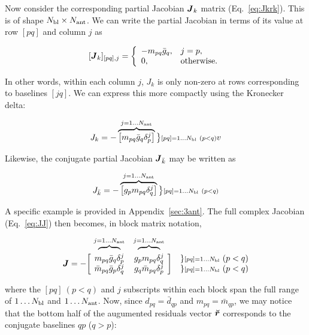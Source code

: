 \documentclass[useAMS,usenatbib]{mn2e}
\newcommand{\mat}[1]{{\bmath{#1}}}
\newcommand{\JJ}{\mat{J}} %
\begin{document}
Now consider the corresponding partial Jacobian $\JJ_k$ matrix (Eq.~\ref{eq:Jkrk}). This is of shape $N_\mathrm{bl}\times N_\mathrm{ant}$. We can write the
partial Jacobian in terms of its value at row $[pq]$ and column $j$ as 

\[
[ \JJ_k ]_{[pq],j} = \left \{  
  \begin{array}{ll} 
  -m_{pq}\bar{g}_q,& j=p, \\
  0, & \mathrm{otherwise.}
  \end{array}
\right .
\]

In other words, within each column $j$, $J_k$ is only non-zero at rows corresponding to baselines $[jq]$. We can express 
this more compactly using the Kronecker delta:


\begin{equation}
\label{eq:Jk}
J_k = - \overbrace{ \Matrix{c}{ m_{pq}\bar{g}_q\delta^{j}_p } } ^{j=1\dots \Na} \big \}{\scriptstyle [pq]=1\dots \Nbl~(p<q)}
v\end{equation}

Likewise, the conjugate partial Jacobian $\JJ_{\bar{k}}$ may be written as

\begin{equation}
\label{eq:Jbark}
J_{\bar{k}} = - \overbrace{ \Matrix{c}{ g_p m_{pq} \delta^{j}_q } } ^{j=1\dots \Na} \big \}{\scriptstyle [pq]=1\dots \Nbl~(p<q)}
\end{equation}

A specific example is provided in Appendix~\ref{sec:3ant}. The full complex Jacobian (Eq.~\ref{eq:JJ}) then 
becomes, in block matrix notation,

\begin{equation}
\label{eq:JJ:di:basic}
\begin{array}{r@{~}cc@{~}cc}
                & \overbrace{~~~~~~~~}^{j=1\dots \Na} & \overbrace{~~~~~~~~}^{j=1\dots \Na} \\
\JJ = - \bigg [ &
  \Stack{ m_{pq}\bar{g}_q\delta^{j}_p \\ \bar{m}_{pq} \bar{g}_p \delta^{j}_q } &
  \Stack{ g_p m_{pq} \delta^{j}_q \\ g_q \bar{m}_{pq} \delta^{j}_p }  
& \bigg ] &
\Stack{ \} {\scriptstyle [pq]=1\dots \Nbl}~(p<q) \\ \} {\scriptstyle [pq]=1\dots \Nbl}~(p<q) }

\end{array}
\end{equation}

where the $[pq]~(p<q)$ and $j$ subscripts within each block span the full range of $1\dots N_\mathrm{bl}$ and $1\dots N_\mathrm{ant}$. Now, 
since $d_{pq} = \bar{d}_{qp}$ and $m_{pq} = \bar{m}_{qp}$, we may notice
that the bottom half of the augumented residuals vector $\Rr$ corresponds to the conjugate baselines 
$qp$ ($q>p$):
\end{document}
